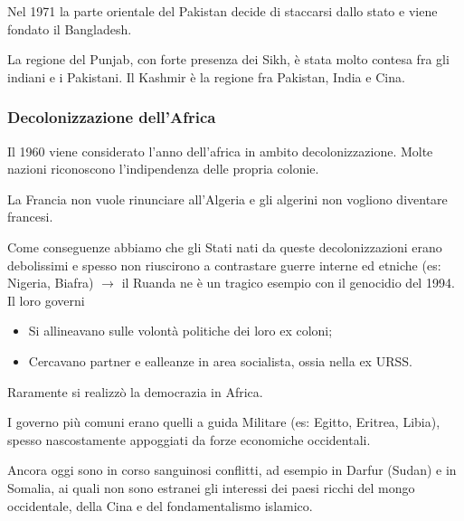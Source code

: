 \documentclass[a4paper]{article}
\begin{document}
Nel 1971 la parte orientale del Pakistan decide di staccarsi dallo stato e viene fondato
il Bangladesh.


La regione del Punjab, con forte presenza dei Sikh, è stata molto contesa fra gli
indiani e i Pakistani.
Il Kashmir è la regione fra Pakistan, India e Cina.

\subsubsection{Decolonizzazione dell'Africa}

Il 1960 viene considerato l'anno dell'africa in ambito decolonizzazione.
Molte nazioni riconoscono l'indipendenza delle propria colonie.


La Francia non vuole rinunciare all'Algeria e gli algerini non vogliono diventare francesi.


Come conseguenze abbiamo che gli Stati nati da queste decolonizzazioni
erano debolissimi e spesso non riuscirono a
contrastare guerre interne ed etniche (es: Nigeria, Biafra)
\(\rightarrow\) il Ruanda ne è un tragico esempio con il genocidio del 1994.
\\
Il loro governi
\begin{itemize}
    \item Si allineavano sulle volontà politiche dei loro ex coloni;
    \item Cercavano partner e ealleanze in area socialista, ossia nella ex URSS.
\end{itemize}
Raramente si realizzò la democrazia in Africa.

I governo più comuni erano quelli a guida Militare (es: Egitto, Eritrea, Libia),
spesso nascostamente appoggiati da forze economiche occidentali.

Ancora oggi sono in corso sanguinosi conflitti, ad esempio in Darfur (Sudan)
e in Somalia, ai quali non sono estranei gli interessi dei paesi ricchi del mongo
occidentale, della Cina e del fondamentalismo islamico.
\end{document}
